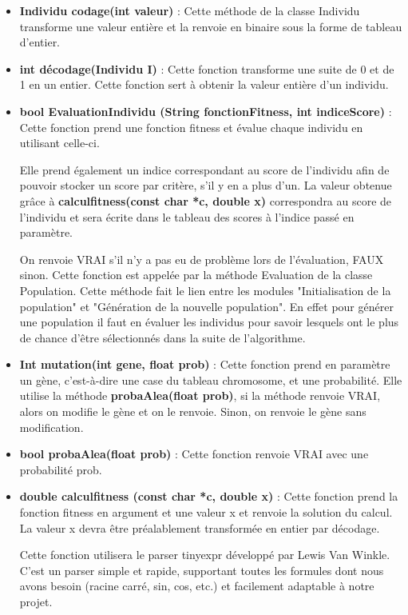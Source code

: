 \documentclass[a4paper,11pt]{article}
\begin{document}
				\begin{itemize}
							\item \textbf{Individu codage(int valeur)} : Cette méthode de la classe Individu transforme une valeur entière et la renvoie en binaire sous la forme de tableau d’entier.\vspace{0.2cm}
							\item \textbf{int décodage(Individu I)} : Cette fonction transforme une suite de 0 et de 1 en un entier. Cette fonction sert à obtenir la valeur entière d’un individu.\vspace{0.2cm}
							\item \textbf{bool EvaluationIndividu (String fonctionFitness, int indiceScore)} : Cette fonction prend une fonction fitness et évalue chaque individu en utilisant celle-ci. 

																									Elle prend également un indice correspondant  au score de l’individu afin de pouvoir stocker un score par critère, s'il y en a plus d'un. 
																									La valeur obtenue grâce à \textbf{calculfitness(const char *c, double x)} correspondra au score de l’individu et sera écrite dans le tableau des scores à l’indice passé en paramètre.

																									On renvoie VRAI s’il n’y a pas eu de problème lors de l’évaluation, FAUX sinon. Cette fonction est appelée par la méthode Evaluation de la classe Population.
																									Cette méthode fait le lien entre les modules "Initialisation de la population" et "Génération de la nouvelle population".
																									En effet pour générer une population il faut en évaluer les individus pour savoir lesquels ont le plus de chance d'être sélectionnés dans la suite de l'algorithme.\vspace{0.2cm}
							\item \textbf{Int mutation(int gene, float prob)} : Cette fonction prend en paramètre un gène, c’est-à-dire une case du tableau chromosome, et une probabilité.
																		Elle utilise la méthode \textbf{probaAlea(float prob)}, si la méthode renvoie VRAI, alors on modifie le gène et on le renvoie.
																		Sinon, on renvoie le gène sans modification.\vspace{0.2cm}
							\item \textbf{bool probaAlea(float prob)} : Cette fonction renvoie VRAI avec une probabilité prob.\vspace{0.2cm}

							\item \textbf{double calculfitness (const char *c, double x)} : Cette fonction prend la fonction fitness en argument et une valeur x et renvoie la solution du calcul. La valeur x devra être préalablement transformée en entier par décodage.

								Cette fonction utilisera le parser tinyexpr développé par Lewis Van Winkle. 
								C’est un parser simple et rapide, supportant toutes les formules dont nous avons besoin (racine carré, sin, cos, etc.) et facilement adaptable à notre projet. 
					\end{itemize}
					
\end{document}

